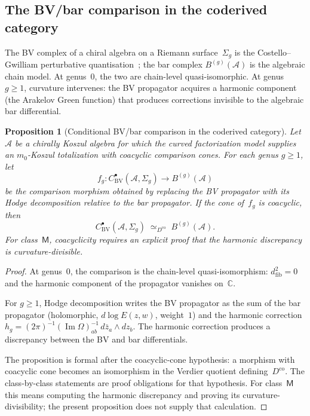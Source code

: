 \documentclass[11pt,reqno]{amsart}
\newtheorem{proposition}[theorem]{Proposition}
\theoremstyle{definition}
\theoremstyle{remark}
\newcommand{\cA}{\mathcal{A}}
\newcommand{\bC}{\mathbb{C}}
\newcommand{\Dco}{D^{\mathrm{co}}}
\numberwithin{equation}{section}
\begin{document}
\subsection{The BV/bar comparison in the coderived
 category}\label{subsec:bv-bar}

The BV complex of a chiral algebra on a Riemann
surface~$\Sigma_g$ is the Costello--Gwilliam perturbative
quantisation~\cite{CG17}; the bar complex $B^{(g)}(\cA)$ is
the algebraic chain model.  At genus~$0$, the two are
chain-level quasi-isomorphic.  At genus~$g \geq 1$, curvature
intervenes: the BV propagator acquires a harmonic component
(the Arakelov Green function) that produces corrections
invisible to the algebraic bar differential.

\begin{proposition}[Conditional BV/bar comparison in the coderived
category]
\label{thm:bv-bar-coderived-vol1}
Let~$\cA$ be a chirally Koszul algebra for which the curved
factorization model supplies an $m_0$-Koszul totalization with
coacyclic comparison cones. For each genus $g \geq 1$, let
\[
f_g \colon
C^\bullet_{\mathrm{BV}}(\cA, \Sigma_g)
\longrightarrow
B^{(g)}(\cA)
\]
be the comparison morphism obtained by replacing the BV
propagator with its Hodge decomposition relative to the bar
propagator.
If the cone of~$f_g$ is coacyclic, then
\[
C^\bullet_{\mathrm{BV}}(\cA, \Sigma_g)
\;\simeq_{\Dco}\;
B^{(g)}(\cA).
\]
For class~$\mathsf{M}$, coacyclicity requires an explicit proof that
the harmonic discrepancy is curvature-divisible.
\end{proposition}

\begin{proof}
At genus~$0$, the comparison is the chain-level
quasi-isomorphism: $d_{\mathrm{fib}}^2 = 0$ and the harmonic
component of the propagator vanishes on~$\bC$.

For $g \geq 1$, Hodge decomposition writes the BV propagator
as the sum of the bar propagator (holomorphic, $d\log E(z,w)$,
weight~$1$) and the harmonic correction
$h_g = (2\pi)^{-1}(\operatorname{Im}\Omega)^{-1}_{ab}\,
d\bar z_a \wedge dz_b$.  The harmonic correction produces a
discrepancy between the BV and bar differentials.

The proposition is formal after the coacyclic-cone hypothesis:
a morphism with coacyclic cone becomes an isomorphism in the
Verdier quotient defining~$\Dco$. The class-by-class statements are
proof obligations for that hypothesis. For class~$\mathsf{M}$ this
means computing the harmonic discrepancy and proving its
curvature-divisibility; the present proposition does not supply that
calculation.
\end{proof}
\end{document}
